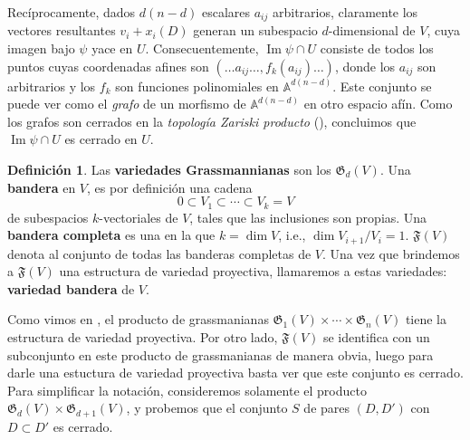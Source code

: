 \documentclass[spanish,10pt]{amsart}
\theoremstyle{definition}
\newtheorem{definition}[theorem]{Definición}
\theoremstyle{remark}
\numberwithin{equation}{section}
\newcommand{\afine}[1]{\mathbb{A}^{#1}}
\newcommand{\Imagen}{\operatorname{Im}}
\begin{document}
Recíprocamente, dados $d (n-d)$ escalares $a_{ij}$ arbitrarios, claramente los vectores resultantes $v_i + x_i (D)$ generan un subespacio $d$-dimensional de $V$, cuya imagen bajo $\psi$ yace en $U$. Consecuentemente, $\Imagen \psi \cap U$ consiste de todos los puntos cuyas coordenadas afines son $(\ldots a_{ij} \ldots, f_k (a_{ij}) \ldots)$, donde los $a_{ij}$ son arbitrarios y los $f_k$ son funciones polinomiales en $\afine {d (n-d)}$. Este conjunto se puede ver como el \textit{grafo} de un morfismo de $\afine{d (n-d)}$ en otro espacio afín. Como los grafos son cerrados en la \textit{topología Zariski producto} (\cite[Teorema 2.6.12.]{notas_pedro}), concluimos que $\Imagen \psi \cap U$ es cerrado en $U$.

\begin{definition}
Las \textbf{variedades Grassmannianas} son los $\mathfrak G _d (V)$. Una \textbf{bandera} en $V$, es por definición una cadena
\[
    0 \subset V_1 \subset \cdots \subset V_k = V
\]
de subespacios $k$-vectoriales de $V$, tales que las inclusiones son propias. Una \textbf{bandera completa} es una en la que $k = \dim V$, i.e., $\dim V_{i+1}/V_i = 1$. $\mathfrak F (V)$ denota al conjunto de todas las banderas completas de $V$. Una vez que brindemos a $\mathfrak F (V)$ una estructura de variedad proyectiva, llamaremos a estas variedades: \textbf{variedad bandera} de $V$.
\end{definition}


Como vimos en \cite[Corolario 2.7.17.]{notas_pedro}, el producto de grassmanianas $\mathfrak G_1 (V) \times \cdots \times \mathfrak G_n (V)$ tiene la estructura de variedad proyectiva. Por otro lado, $\mathfrak F (V)$ se identifica con un subconjunto en este producto de grassmanianas de manera obvia, luego para darle una estuctura de variedad proyectiva basta ver que este conjunto es cerrado. Para simplificar la notación, consideremos solamente el producto $\mathfrak G _d (V) \times \mathfrak G_{d+1} (V)$, y probemos que el conjunto $S$ de pares $(D, D')$ con $D \subset D'$ es cerrado.
\end{document}
